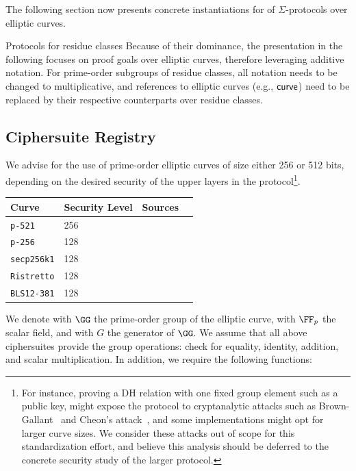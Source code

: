 \documentclass[11pt]{article}
\begin{document}

The following section now presents concrete instantiations for of $\Sigma$-protocols over elliptic curves.

\begin{remark}{Protocols for residue classes}{}
  Because of their dominance, the presentation in the following focuses on proof goals over elliptic curves, therefore leveraging additive notation.
	For prime-order subgroups of residue classes, all notation needs to be changed to multiplicative, and references to elliptic curves (e.g., $\textsf{curve}$) need to be replaced by their respective counterparts over residue classes.
\end{remark}

\subsection{Ciphersuite Registry}
 We advise for the use of prime-order elliptic curves of size either 256 or 512 bits, depending on the desired security of the upper layers in the protocol\footnote{For instance, proving a DH relation with one fixed group element such as a public key, might expose the protocol to cryptanalytic attacks such as Brown-Gallant~\cite{EPRINT:BroGal04} and Cheon’s attack~\cite{EC:Cheon06}, and some implementations might opt for larger curve sizes. We consider these attacks out of scope for this standardization effort, and believe this analysis should be deferred to the concrete security study of the larger protocol.}.

 \vspace{1em}
 \begin{center}
 \begin{tabular}{llcc}
  \hline
  Curve  & Security Level & Sources \\
  \hline
  \verb|p-521|     & 256& \cite{fips2} \\
  \verb|p-256|     & 128 & \cite{fips2}  \\
  \verb|secp256k1| & 128 & \cite{SECG} \\
  \verb|Ristretto| & 128 & \cite{cfrg-ristretto-decaf} \\
  \verb|BLS12-381| & 128 & \cite{bls12} \\
 \end{tabular}
\end{center}
We denote with $\GG$ the prime-order group of the elliptic curve, with $\FF_p$ the scalar field, and with $G$ the generator of $\GG$.
We assume that all above ciphersuites provide the group operations: check for equality, identity, addition, and scalar multiplication.
In addition, we require the following functions:
\end{document}
